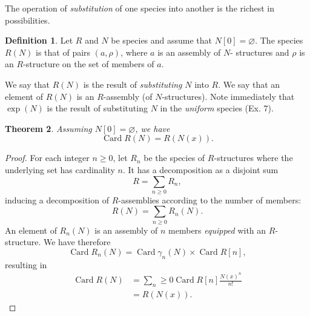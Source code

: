 \documentclass{amsart}
\newtheorem{thm}{Theorem}[section]
\theoremstyle{definition}
\newtheorem{defn}[thm]{Definition}
\theoremstyle{remark}
\DeclareMathOperator{\Card}{Card}
\newcommand{\term}[1]{\emph{#1}}
\begin{document}
The operation of \term{substitution} of one species into another is
the richest in possibilities.

\begin{defn}
Let $R$ and $N$ be species and assume that $N [0] = \varnothing$.
The species $R (N)$ is that of pairs $(a, \rho)$, where $a$ is an assembly of $N$-
structures and $\rho$ is an $R$-structure on the set of members of $a$.

We say that $R (N)$ is the result of \term{substituting} $N$ into $R$. We
say that an element of $R (N)$ is an $R$-assembly (of $N$-structures). Note
immediately that $\exp (N)$ is the result of substituting $N$ in
the \emph{uniform} species (Ex. 7).
\end{defn}

\begin{thm} \label{thm:card-subst}
  Assuming $N [0] = \varnothing$, we have
  \[ \Card R (N) = R (N (x)). \]
\end{thm}

\begin{proof}
For each integer $n \geq 0$, let $R_n$ be the species of $R$-structures
where the underlying set has cardinality $n$. It has a decomposition
as a disjoint sum
\[ R = \sum_{n \geq 0} R_n, \]
inducing a decomposition of $R$-assemblies according to the number of
members:
\[ R (N) = \sum_{n \geq 0} R_n(N). \]
An element of $R_n(N)$ is an assembly of $n$ members \emph{equipped} with an $R$-structure.
We have therefore
\[ \Card R_n(N) = \Card \gamma_n(N) \times \Card R [n], \]
resulting in
\begin{align*} \Card R(N) &= \sum_n \geq 0 \Card R[n]
  \frac{N(x)^n}{n!} \\
  &= R(N(x)).
\end{align*}
\end{proof}
\end{document}
